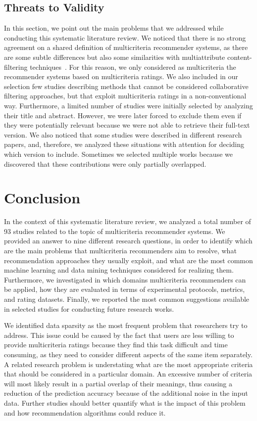 \subsection{Threats to Validity}

In this section, we point out the main problems that we addressed while conducting this systematic literature review. We noticed that there is no strong agreement on a shared definition of multicriteria recommender systems, as there are some subtle differences but also some similarities with multiattribute content-filtering techniques~\cite{Adomavicius2015}. For this reason, we only considered as multicriteria the recommender systems based on multicriteria ratings. We also included in our selection few studies describing methods that cannot be considered collaborative filtering approaches, but that exploit multicriteria ratings in a non-conventional way. Furthermore, a limited number of studies were initially selected by analyzing their title and abstract. However, we were later forced to exclude them even if they were potentially relevant because we were not able to retrieve their full-text version. We also noticed that some studies were described in different research papers, and, therefore, we analyzed these situations with attention for deciding which version to include. Sometimes we selected multiple works because we discovered that these contributions were only partially overlapped.

\section{Conclusion}
\label{mcr:sec:conclusions}

In the context of this systematic literature review, we analyzed a total number of 93 studies related to the topic of multicriteria recommender systems. We provided an answer to nine different research questions, in order to identify which are the main problems that multicriteria recommenders aim to resolve, what recommendation approaches they usually exploit, and what are the most common machine learning and data mining techniques considered for realizing them. Furthermore, we investigated in which domains multicriteria recommenders can be applied, how they are evaluated in terms of experimental protocols, metrics, and rating datasets. Finally, we reported the most common suggestions available in selected studies for conducting future research works.

We identified data sparsity as the most frequent problem that researchers try to address. This issue could be caused by the fact that users are less willing to provide multicriteria ratings because they find this task difficult and time consuming, as they need to consider different aspects of the same item separately. A related research problem is understating what are the most appropriate criteria that should be considered in a particular domain. An excessive number of criteria will most likely result in a partial overlap of their meanings, thus causing a reduction of the prediction accuracy because of the additional noise in the input data. Further studies should better quantify what is the impact of this problem and how recommendation algorithms could reduce it.

